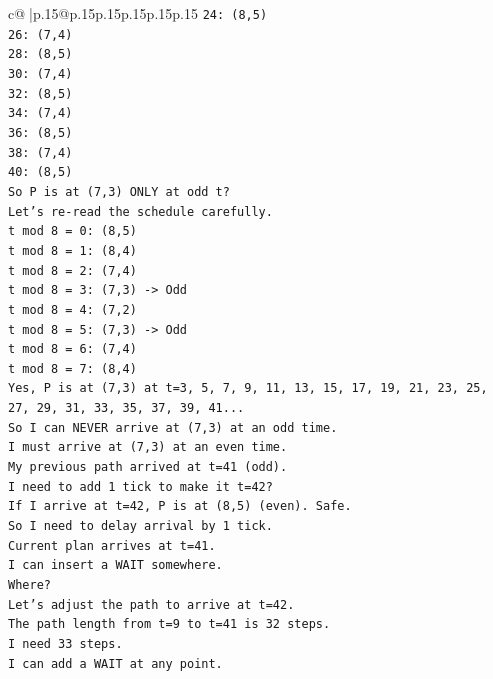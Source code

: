 \documentclass{article}
\begin{document}
{\begin{supertabular}{c@{$\;$}|p{.15\linewidth}@{}p{.15\linewidth}p{.15\linewidth}p{.15\linewidth}p{.15\linewidth}p{.15\linewidth}}
{{{\texttt{24: (8,5)} \\
\texttt{26: (7,4)} \\
\texttt{28: (8,5)} \\
\texttt{30: (7,4)} \\
\texttt{32: (8,5)} \\
\texttt{34: (7,4)} \\
\texttt{36: (8,5)} \\
\texttt{38: (7,4)} \\
\texttt{40: (8,5)} \\
\texttt{So P is at (7,3) ONLY at odd t?} \\
\texttt{Let's re{-}read the schedule carefully.} \\
\texttt{t mod 8 = 0: (8,5)} \\
\texttt{t mod 8 = 1: (8,4)} \\
\texttt{t mod 8 = 2: (7,4)} \\
\texttt{t mod 8 = 3: (7,3) {-}> Odd} \\
\texttt{t mod 8 = 4: (7,2)} \\
\texttt{t mod 8 = 5: (7,3) {-}> Odd} \\
\texttt{t mod 8 = 6: (7,4)} \\
\texttt{t mod 8 = 7: (8,4)} \\
\texttt{Yes, P is at (7,3) at t=3, 5, 7, 9, 11, 13, 15, 17, 19, 21, 23, 25, 27, 29, 31, 33, 35, 37, 39, 41...} \\
\texttt{So I can NEVER arrive at (7,3) at an odd time.} \\
\texttt{I must arrive at (7,3) at an even time.} \\
\texttt{My previous path arrived at t=41 (odd).} \\
\texttt{I need to add 1 tick to make it t=42?} \\
\texttt{If I arrive at t=42, P is at (8,5) (even). Safe.} \\
\texttt{So I need to delay arrival by 1 tick.} \\
\texttt{Current plan arrives at t=41.} \\
\texttt{I can insert a WAIT somewhere.} \\
\texttt{Where?} \\
\texttt{Let's adjust the path to arrive at t=42.} \\
\texttt{The path length from t=9 to t=41 is 32 steps.} \\
\texttt{I need 33 steps.} \\
\texttt{I can add a WAIT at any point.} \\
}}}
\end{supertabular}}
\end{document}
